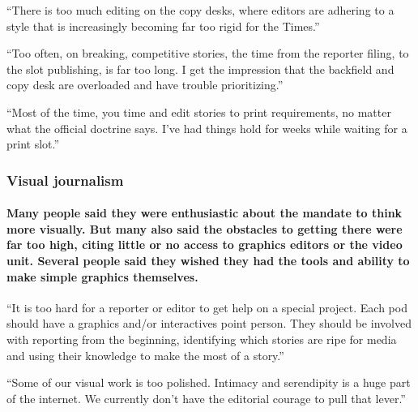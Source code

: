 ``There is too much editing on the copy desks, where editors are
adhering to a style that is increasingly becoming far too rigid for the
Times.''

``Too often, on breaking, competitive stories, the time from the
reporter filing, to the slot publishing, is far too long. I get the
impression that the backfield and copy desk are overloaded and have
trouble prioritizing.''

``Most of the time, you time and edit stories to print requirements, no
matter what the official doctrine says. I've had things hold for weeks
while waiting for a print slot.''

\hypertarget{visual-journalism}{%
\subsubsection{Visual journalism}\label{visual-journalism}}

\hypertarget{many-people-said-they-were-enthusiastic-about-the-mandate-to-think-more-visually-but-many-also-said-the-obstacles-to-getting-there-were-far-too-high-citing-little-or-no-access-to-graphics-editors-or-the-video-unit-several-people-said-they-wished-they-had-the-tools-and-ability-to-make-simple-graphics-themselves}{%
\paragraph{Many people said they were enthusiastic about the mandate to
think more visually. But many also said the obstacles to getting there
were far too high, citing little or no access to graphics editors or the
video unit. Several people said they wished they had the tools and
ability to make simple graphics
themselves.}\label{many-people-said-they-were-enthusiastic-about-the-mandate-to-think-more-visually-but-many-also-said-the-obstacles-to-getting-there-were-far-too-high-citing-little-or-no-access-to-graphics-editors-or-the-video-unit-several-people-said-they-wished-they-had-the-tools-and-ability-to-make-simple-graphics-themselves}}

``It is too hard for a reporter or editor to get help on a special
project. Each pod should have a graphics and/or interactives point
person. They should be involved with reporting from the beginning,
identifying which stories are ripe for media and using their knowledge
to make the most of a story.''

``Some of our visual work is too polished. Intimacy and serendipity is a
huge part of the internet. We currently don't have the editorial courage
to pull that lever.''

